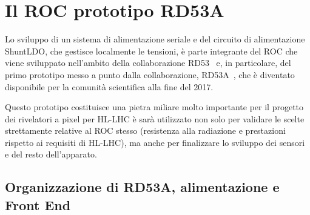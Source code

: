 \chapter{Il ROC prototipo RD53A}
\label{cap:RD53A}

Lo sviluppo di un sistema di alimentazione seriale e del circuito di alimentazione ShuntLDO, che gestisce localmente le tensioni, è parte integrante del ROC che viene sviluppato nell'ambito della collaborazione RD53~\cite{RD53} e, in particolare, del primo prototipo messo a punto dalla collaborazione, RD53A~\cite{RD53A}, che \`e diventato disponibile per la comunit\`a scientifica alla fine del 2017.

Questo prototipo costituisce una pietra miliare molto importante per il progetto dei rivelatori a pixel per HL-LHC \`e sar\`a utilizzato non solo per validare le scelte strettamente relative al ROC stesso (resistenza alla radiazione e prestazioni rispetto ai requisiti di HL-LHC), ma anche per finalizzare lo sviluppo dei sensori e del resto dell'apparato.

\section{Organizzazione di RD53A, alimentazione e Front End}
\label{Organizzazionechip}


